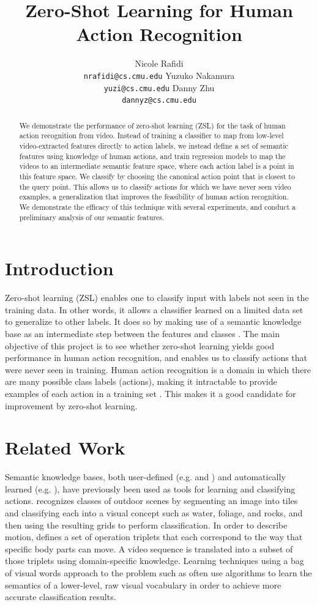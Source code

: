 \documentclass{article}
\title{Zero-Shot Learning for Human Action Recognition}
\author{Nicole Rafidi \\
  \texttt{nrafidi@cs.cmu.edu}
  \And
  Yuzuko Nakamura \\
  \texttt{yuzi@cs.cmu.edu}
  \And
  Danny Zhu \\
  \texttt{dannyz@cs.cmu.edu}
}
\begin{document}
\maketitle

\begin{abstract}
We demonstrate the performance of zero-shot learning (ZSL) for the task of human action recognition from video. Instead of training a classifier to map from low-level video-extracted features directly to action labels, we instead define a set of semantic features using knowledge of human actions, and train regression models to map the videos to an intermediate semantic feature space, where each action label is a point in this feature space. We classify by choosing the canonical action point that is closest to the query point. This allows us to classify actions for which we have never seen video examples, a generalization that improves the feasibility of human action recognition. We demonstrate the efficacy of this technique with several experiments, and conduct a preliminary analysis of our semantic features.
\end{abstract}

\section{Introduction}
Zero-shot learning (ZSL) enables one to classify input with labels not seen in the training data. In other words, it allows a classifier learned on a limited data set to generalize to other labels. It does so by making use of a semantic knowledge base as an intermediate step between the features and classes \cite{Palatucci09}. The main objective of this project is to see whether zero-shot learning yields good performance in human action recognition, and enables us to classify actions that were never seen in training. Human action recognition is a domain in which there are many possible class labels (actions), making it intractable to provide examples of each action in a training set \cite{Poppe10}. This makes it a good candidate for improvement by zero-shot learning.

\section{Related Work}
Semantic knowledge bases, both user-defined (e.g. \cite{Vogel07} and \cite{Park04}) and automatically learned (e.g. \cite{Zhao10}), have previously been used as tools for learning and classifying actions. \cite{Vogel07} recognizes classes of outdoor scenes by segmenting an image into tiles and classifying each into a visual concept such as water, foliage, and rocks, and then using the resulting grids to perform classification. In order to describe motion, \cite{Park04} defines a set of operation triplets that each correspond to the way that specific body parts can move. A video sequence is translated into a subset of those triplets using domain-specific knowledge. Learning techniques using a bag of visual words approach to the problem such as \cite{Zhao10} often use algorithms to learn the semantics of a lower-level, raw visual vocabulary in order to achieve more accurate classification results.
\end{document}
